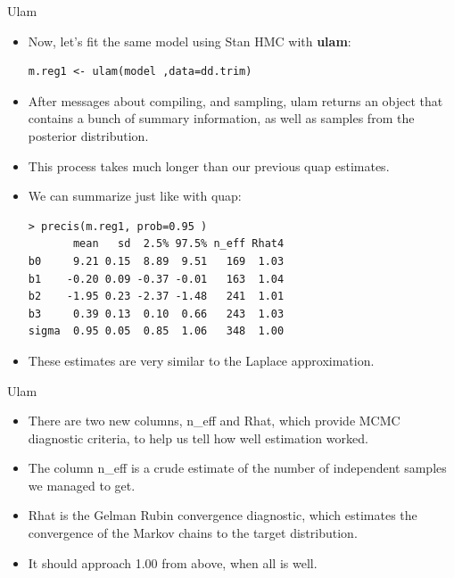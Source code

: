 \documentclass[handout]{beamer}
\begin{document}
\begin{frame}[fragile]{Ulam}
\scriptsize{

\begin{itemize}
\item Now, let's fit the same model using Stan HMC with \textbf{ulam}:

\begin{verbatim}
m.reg1 <- ulam(model ,data=dd.trim) 
\end{verbatim}



\item After messages about compiling, and sampling, ulam returns an object that contains a
bunch of summary information, as well as samples from the posterior distribution.

\item This process takes much longer than our previous quap estimates.

\item We can summarize just like with quap:

\begin{verbatim}
> precis(m.reg1, prob=0.95 )
       mean   sd  2.5% 97.5% n_eff Rhat4
b0     9.21 0.15  8.89  9.51   169  1.03
b1    -0.20 0.09 -0.37 -0.01   163  1.04
b2    -1.95 0.23 -2.37 -1.48   241  1.01
b3     0.39 0.13  0.10  0.66   243  1.03
sigma  0.95 0.05  0.85  1.06   348  1.00
\end{verbatim}

\item These estimates are very similar to the Laplace approximation.


\end{itemize}




} 
\end{frame}


\begin{frame}[fragile]{Ulam}
\scriptsize{

\begin{itemize}

\item There are two new columns, n\_eff and Rhat, which provide MCMC diagnostic criteria, to help us tell how well estimation worked. 

\item The column n\_eff is a crude estimate of the number of independent samples we managed to get.

\item Rhat  is the Gelman Rubin convergence diagnostic, which estimates  the convergence of the Markov chains to the target distribution.

\item It should approach 1.00 from above, when all is well.


 \end{itemize}







} 
\end{frame}
\end{document}
